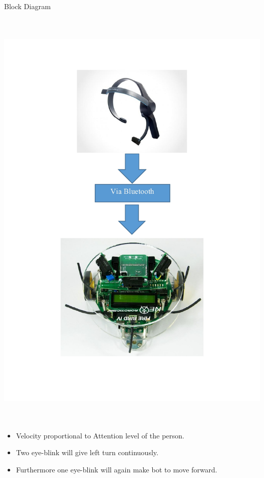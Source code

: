 \documentclass[14pt]{article}
\begin{document}
\begin{center}
{\Huge Block Diagram}
\end{center}
\begin{center}
	\graphicspath{ {images/} }
	\includegraphics[width=17cm, height=21cm]{Block_diagram}
\end{center}
\begin{itemize}
	\item Velocity proportional to Attention level of the person.
	\item Two eye-blink will give left turn continuously.
	\item Furthermore one eye-blink will again make bot to move forward.
\end{itemize}
\end{document}
